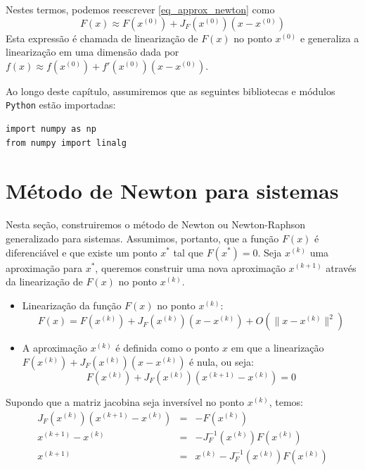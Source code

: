 Nestes termos, podemos reescrever \eqref{eq_approx_newton} como
$$F(x)\approx F(x^{(0)}) + J_F(x^{(0)}) (x-x^{(0)})$$
Esta expressão é chamada de linearização de $F(x)$ no ponto $x^{(0)}$ e generaliza a linearização em uma dimensão dada por $f(x)\approx f(x^{(0)})+f'(x^{(0)}) (x-x^{(0)})$.

\ifispython
Ao longo deste capítulo, assumiremos que as seguintes bibliotecas e módulos \verb+Python+ estão importadas:
\begin{verbatim}
import numpy as np
from numpy import linalg
\end{verbatim}
\fi

\section{Método de  Newton para sistemas}

Nesta seção, construiremos o método de Newton ou Newton-Raphson generalizado para sistemas. Assumimos, portanto, que a função $F(x)$ é diferenciável e que existe um ponto $x^*$ tal que $F(x^*)=0$. Seja $x^{(k)}$ uma aproximação para $x^*$, queremos construir uma nova aproximação $x^{(k+1)}$ através da linearização de $F(x)$ no ponto $x^{(k)}$.

\begin{itemize}
\item Linearização da função $F(x)$ no ponto $x^{(k)}$:
  \begin{equation*}
F(x)= F(x^{(k)})+ J_F\left(x^{(k)}\right) \left(x-x^{(k)}\right)  + O\left(\|x-x^{(k)}\|^2\right)
  \end{equation*}
\item A aproximação $x^{(k)}$ é definida como o ponto $x$ em que a linearização $F(x^{(k)})+ J_F\left(x^{(k)}\right) \left(x-x^{(k)}\right)$ é nula, ou seja:
$$F(x^{(k)})+ J_F\left(x^{(k)}\right) \left(x^{(k+1)}-x^{(k)}\right)=0$$
\end{itemize}

Supondo que a matriz jacobina seja inversível no ponto $x^{(k)}$, temos:
\begin{eqnarray*}
J_F\left(x^{(k)}\right) \left(x^{(k+1)}-x^{(k)}\right)&=&-F(x^{(k)})\\
x^{(k+1)}-x^{(k)}&=&-J_F^{-1}\left(x^{(k)}\right)F(x^{(k)})\\
x^{(k+1)}&=&x^{(k)}-J_F^{-1}\left(x^{(k)}\right)F(x^{(k)})
\end{eqnarray*}

